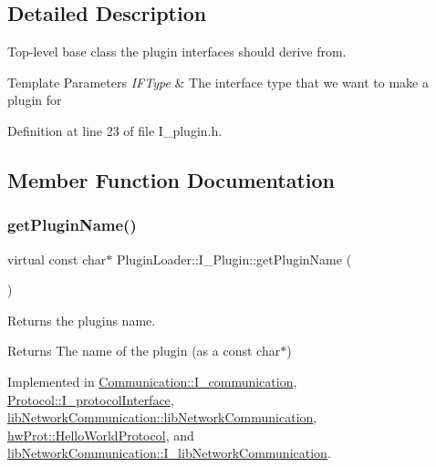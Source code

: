 \subsection{Detailed Description}
Top-\/level base class the plugin interfaces should derive from. 


\begin{DoxyTemplParams}{Template Parameters}
{\em I\+F\+Type} & The interface type that we want to make a plugin for \\
\hline
\end{DoxyTemplParams}


Definition at line 23 of file I\+\_\+plugin.\+h.



\subsection{Member Function Documentation}
\mbox{\label{classPluginLoader_1_1I__Plugin_a4c45255b16398fff512940a5e5b8322a}} 
\subsubsection{\texorpdfstring{getPluginName()}{getPluginName()}}
{\footnotesize\ttfamily virtual const char$\ast$ Plugin\+Loader\+::\+I\+\_\+\+Plugin\+::get\+Plugin\+Name (\begin{DoxyParamCaption}{ }\end{DoxyParamCaption})\hspace{0.3cm}{\ttfamily [pure virtual]}}



Returns the plugins name. 

\begin{DoxyReturn}{Returns}
The name of the plugin (as a const char$\ast$) 
\end{DoxyReturn}


Implemented in \mbox{\hyperlink{classCommunication_1_1I__communication_a5ef61375a8126f29c38cc1aa17339563}{Communication\+::\+I\+\_\+communication}}, \mbox{\hyperlink{classProtocol_1_1I__protocolInterface_a53e95b7d9ea9ad8ee179c2663511ce20}{Protocol\+::\+I\+\_\+protocol\+Interface}}, \mbox{\hyperlink{classlibNetworkCommunication_1_1libNetworkCommunication_a2d09c69b582a66b37100ce87ee1acdd1}{lib\+Network\+Communication\+::lib\+Network\+Communication}}, \mbox{\hyperlink{classhwProt_1_1HelloWorldProtocol_acca6465073e5919a7a74b8f74e869e8e}{hw\+Prot\+::\+Hello\+World\+Protocol}}, and \mbox{\hyperlink{classlibNetworkCommunication_1_1I__libNetworkCommunication_aa4a1a2180bdbf7b13ec0dd17f3cbb459}{lib\+Network\+Communication\+::\+I\+\_\+lib\+Network\+Communication}}.

